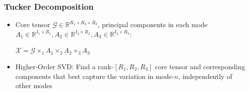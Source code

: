 \documentclass{beamer}
\begin{document}
\begin{frame}
\frametitle{Tucker Decomposition}
\begin{itemize}
\item Core tensor $\mathcal{G}\in \mathbb{R}^{R_1\times R_2\times R_3}$, principal components in each mode $A_1\in \mathbb{R}^{I_1\times R_1},A_2\in \mathbb{R}^{I_2\times R_2}, A_3\in \mathbb{R}^{I_3\times R_3}$:\\ \begin{center} $ \mathcal{X} =  \mathcal{G} \times_1 A_1\times_2 A_2 \times_3 A_3$\end{center}
\item Higher-Order SVD: Find a rank-$[R_1,R_2,R_3]$ core tensor and corresponding components that best capture the variation in mode-$n$, independently of other modes%
\end{itemize}
\end{frame}
\end{document}

